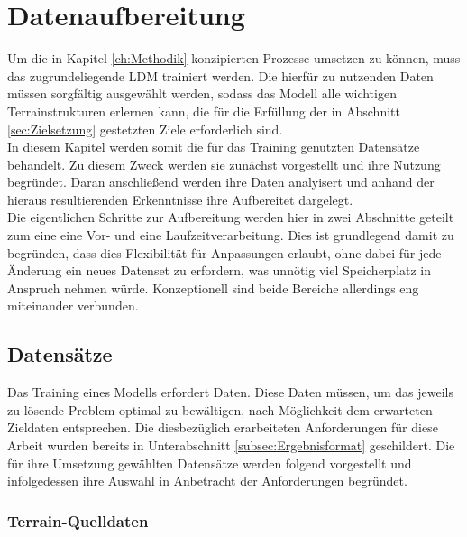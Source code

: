 \chapter{Datenaufbereitung}
\label{ch:Datenaufbereitung}

Um die in Kapitel \ref{ch:Methodik} konzipierten Prozesse umsetzen zu können, muss das zugrundeliegende LDM trainiert werden. Die hierfür zu nutzenden Daten müssen sorgfältig ausgewählt werden, sodass das Modell alle wichtigen Terrainstrukturen erlernen kann, die für die Erfüllung der in Abschnitt \ref{sec:Zielsetzung} gestetzten Ziele erforderlich sind. \\
In diesem Kapitel werden somit die für das Training genutzten Datensätze behandelt. Zu diesem Zweck werden sie zunächst vorgestellt und ihre Nutzung begründet. Daran anschließend werden ihre Daten analyisert und anhand der hieraus resultierenden Erkenntnisse ihre Aufbereitet dargelegt. \\
Die eigentlichen Schritte zur Aufbereitung werden hier in zwei Abschnitte geteilt zum eine eine Vor- und eine Laufzeitverarbeitung. Dies ist grundlegend damit zu begründen, dass dies Flexibilität für Anpassungen erlaubt, ohne dabei für jede Änderung ein neues Datenset zu erfordern, was unnötig viel Speicherplatz in Anspruch nehmen würde. Konzeptionell sind beide Bereiche allerdings eng miteinander verbunden.

\section{Datensätze}

Das Training eines Modells erfordert Daten. Diese Daten müssen, um das jeweils zu lösende Problem optimal zu bewältigen, nach Möglichkeit dem erwarteten Zieldaten entsprechen. Die diesbezüglich erarbeiteten Anforderungen für diese Arbeit wurden bereits in Unterabschnitt \ref{subsec:Ergebnisformat} geschildert. Die für ihre Umsetzung gewählten Datensätze werden folgend vorgestellt und infolgedessen ihre Auswahl in Anbetracht der Anforderungen begründet.

\subsection{Terrain-Quelldaten}

